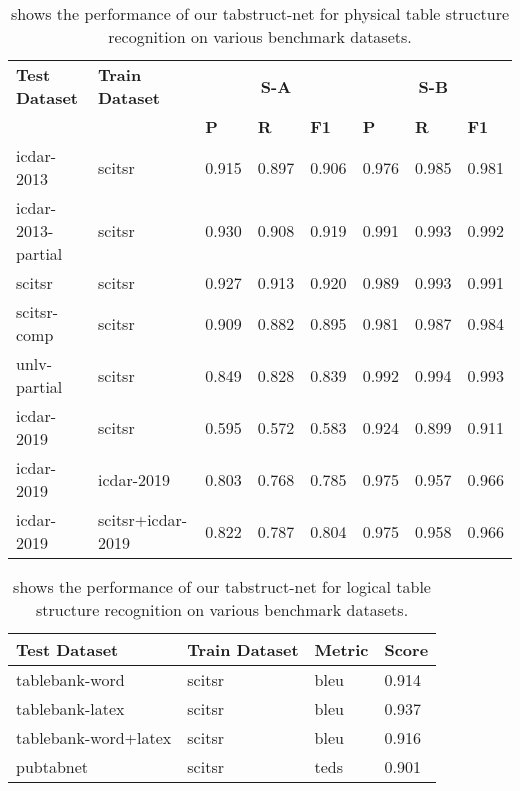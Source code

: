 \documentclass[runningheads]{llncs}
\begin{document}
\begin{table}[t!]
\begin{center}
\begin{tabular}{|l|l|l l l |l l l|} \hline
\textbf{Test Dataset} &\textbf{Train Dataset} &\multicolumn{3}{c|}{\textbf{S-A}} &\multicolumn{3}{c|}{\textbf{S-B}} \\ \cline{3-8}
  &  &\textbf{P} &\textbf{R} &\textbf{F1} &\textbf{P} &\textbf{R} &\textbf{F1} \\ \hline
{\sc icdar-2013} &{\sc s}ci{\sc tsr}          &0.915 &0.897 &0.906 &0.976 &0.985 &0.981 \\  
{\sc icdar-2013}-partial &{\sc s}ci{\sc tsr}  &0.930 &0.908 &0.919 &0.991 &0.993 &0.992 \\  
{\sc s}ci{\sc tsr} &{\sc s}ci{\sc tsr}        &0.927 &0.913	&0.920 &0.989 &0.993 &0.991 \\
{\sc s}ci{\sc tsr}-comp	&{\sc s}ci{\sc tsr}	  &0.909 &0.882	&0.895 &0.981 &0.987 &0.984 \\
{\sc unlv}-partial	&{\sc s}ci{\sc tsr}       &0.849 &0.828	&0.839 &0.992 &0.994 &0.993 \\
{\sc icdar-2019}    &{\sc s}ci{\sc tsr}       &0.595 &0.572	&0.583 &0.924 &0.899 &0.911 \\
{\sc icdar-2019}    &{\sc icdar-2019}	      &0.803 &0.768	&0.785 &0.975 &0.957 &0.966 \\
{\sc icdar-2019}	&{\sc s}ci{\sc tsr}+{\sc icdar-2019} &0.822 &0.787	&0.804 &0.975 &0.958 &0.966 \\ \hline
\end{tabular}
\end{center}
\caption{shows the performance of our {\sc t}ab{\sc s}truct-{\sc n}et for physical table structure recognition on various benchmark datasets. \label{physical_structure_recognition_all}}
\vspace{-1em}
\end{table}

\begin{table}[ht!]
\begin{center}
\begin{tabular}{|l|l|l|l|} \hline
\textbf{Test Dataset} &\textbf{Train Dataset} &\textbf{Metric}  &\textbf{Score} \\ \hline
{\sc t}able{\sc b}ank-{\sc w}ord &{\sc s}ci{\sc tsr} &{\sc bleu} &0.914 \\ 
{\sc t}able{\sc b}ank-{\sc l}a{\sc t}e{\sc x} &{\sc s}ci{\sc tsr} &{\sc bleu} &0.937 \\
{\sc t}able{\sc b}ank-{\sc w}ord+{\sc l}a{\sc t}e{\sc x} &{\sc s}ci{\sc tsr} &{\sc bleu} &0.916 \\
{\sc p}ub{\sc t}ab{\sc n}et &{\sc s}ci{\sc tsr} &{\sc teds} &0.901 \\ \hline 
\end{tabular}
\end{center}
\caption{shows the performance of our {\sc t}ab{\sc s}truct-{\sc n}et for logical table structure recognition on various benchmark datasets. \label{logical_structure_recognition_all}}
\vspace{-1em}
\end{table}
\end{document}
